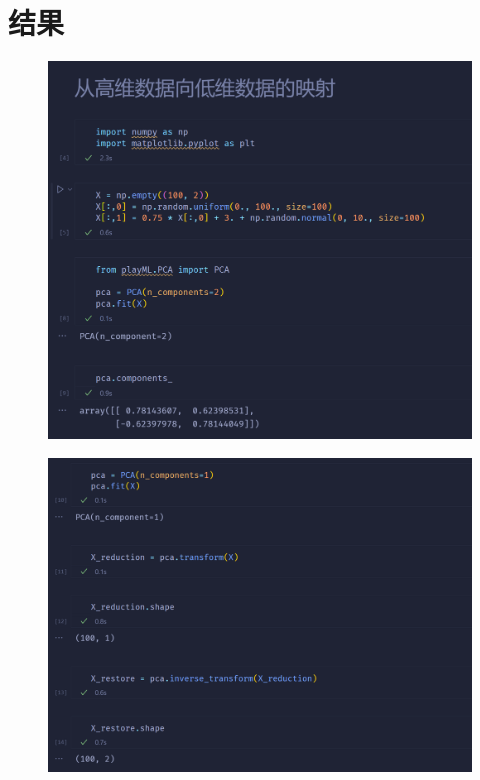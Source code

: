 \documentclass{article}
\begin{document}
\section{结果}
\begin{figure}[H]
    \centering
    \includegraphics[width=\linewidth]{1.png}
\end{figure}
\begin{figure}[H]
    \centering
    \includegraphics[width=\linewidth]{2.png}
\end{figure}
\end{document}
